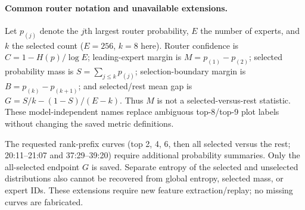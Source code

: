 \paragraph{Common router notation and unavailable extensions.}
Let $p_{(j)}$ denote the $j$th largest router probability, $E$ the number
of experts, and $k$ the selected count ($E=256$, $k=8$ here). Router
confidence is $C=1-H(p)/\log E$; leading-expert margin is
$M=p_{(1)}-p_{(2)}$; selected probability mass is
$S=\sum_{j\leq k}p_{(j)}$; selection-boundary margin is
$B=p_{(k)}-p_{(k+1)}$; and selected/rest mean gap is
$G=S/k-(1-S)/(E-k)$. Thus $M$ is not a selected-versus-rest statistic.
These model-independent names replace ambiguous top-8/top-9 plot labels
without changing the saved metric definitions.

The requested rank-prefix curves (top 2, 4, 6, then all selected versus
the rest; 20:11--21:07 and 37:29--39:20) require additional probability
summaries. Only the all-selected endpoint $G$ is saved. Separate entropy
of the selected and unselected distributions also cannot be recovered
from global entropy, selected mass, or expert IDs. These extensions
require new feature extraction/replay; no missing curves are fabricated.
